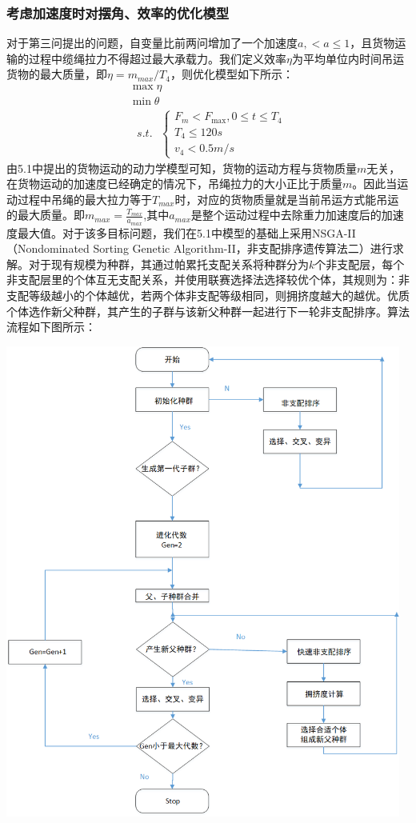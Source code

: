 \documentclass[withoutpreface,bwprint]{cumcmthesis} %
\begin{document}
\subsubsection{考虑加速度时对摆角、效率的优化模型}
对于第三问提出的问题，自变量比前两问增加了一个加速度$a,<a\leq1$，且货物运输的过程中缆绳拉力不得超过最大承载力。我们定义效率$\eta$为平均单位内时间吊运货物的最大质量，即$\eta=m_{max}/T_4$，则优化模型如下所示：
$$\begin{array}{l}
    \max \eta \\
    \min \theta \\
    \text { $s.t.$ }\left\{\begin{array}{c}
    F_{m}<F_{\max }, 0 \leqslant t \leqslant T_{4} \\
    T_{4} \leqslant 120 s \\
    v_{4}<0.5 m / s
    \end{array}\right.
\end{array}$$
由5.1中提出的货物运动的动力学模型可知，货物的运动方程与货物质量$m$无关，在货物运动的加速度已经确定的情况下，吊绳拉力的大小正比于质量$m$。因此当运动过程中吊绳的最大拉力等于$T_{max}$时，对应的货物质量就是当前吊运方式能吊运的最大质量。即$m_{max}=\frac{T_{max}}{a_{max}}$,其中$a_{max}$是整个运动过程中去除重力加速度后的加速度最大值。对于该多目标问题，我们在5.1中模型的基础上采用NSGA-II（Nondominated Sorting Genetic Algorithm-II，非支配排序遗传算法二）进行求解。对于现有规模为种群，其通过帕累托支配关系将种群分为$k$个非支配层，每个非支配层里的个体互无支配关系，并使用联赛选择法选择较优个体，其规则为：非支配等级越小的个体越优，若两个体非支配等级相同，则拥挤度越大的越优。优质个体选作新父种群，其产生的子群与该新父种群一起进行下一轮非支配排序。算法流程如下图所示：

\centerline{\includegraphics[width=13cm]{p2demo.png}}
\end{document}
